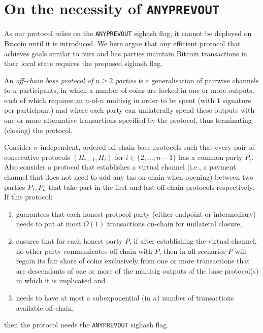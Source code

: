 \section{On the necessity of \texttt{ANYPREVOUT}}
  \label{section:anyprevout}
  As our protocol relies on the \texttt{ANYPREVOUT} sighash flag, it cannot be
  deployed on Bitcoin until it is introduced. We here argue that any efficient
  protocol that achieves goals similar to ours and has parties maintain 
  Bitcoin transactions in their local state requires  the proposed sighash flag. 

  \begin{definition}
    An \emph{off-chain base protocol of $n \geq 2$ parties} is a generalisation
    of pairwise channels to $n$ participants, in which a number of coins are
    locked in one or more outputs, each of which requires an $n$-of-$n$ multisig
    in order to be spent (with $1$ signature per participant) and where each
    party can unilaterally spend these outputs with one or more alternative
    transactions specified by the protocol, thus terminating (closing) the
    protocol.
  \end{definition}

  \begin{theorem}
    \label{theorem:anyprevout}
    Consider $n$ independent, ordered off-chain base protocols
    such that every pair of consecutive protocols $(\Pi_{i-1}, \Pi_i)$ for $i
    \in \{2, \dots, n-1\}$ has a common party $P_i$. Also consider a protocol
    that establishes a virtual channel (i.e., a payment channel that does not
    need to add any txs on-chain when opening) between two parties $P_1, P_n$
    that take part in the first and last off-chain protocols respectively. If
    this protocol:
    \begin{enumerate}
    \item guarantees that each honest protocol party (either endpoint or
    intermediary) needs to put at most $O(1)$ transactions on-chain for
    unilateral closure,
    \item ensures that for each honest party $P$, if after establishing the
    virtual channel, no other party communicates off-chain with $P$, then in all
    scenarios $P$ will regain its fair share of coins exclusively from one or
    more transactions that are descendants of one or more of the multisig
    outputs of the base protocol(s) in which it is implicated and
    \item needs to have at most a subexponential (in $n$) number of transactions
    available off-chain,
    \end{enumerate}
    then the protocol needs the \texttt{ANYPREVOUT} sighash flag.
  \end{theorem}

